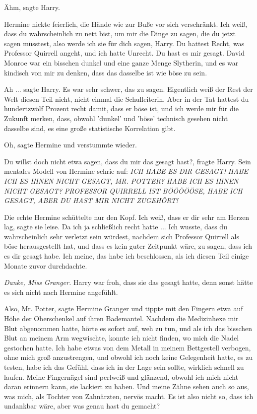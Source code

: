 \glqq{}Ähm\grqq{}, sagte Harry.

Hermine nickte feierlich, die Hände wie zur Buße vor sich verschränkt. \glqq{}Ich
weiß, dass du wahrscheinlich zu nett bist, um mir die Dinge zu sagen, die du
jetzt sagen müsstest, also werde ich sie für dich sagen, Harry. Du hattest
Recht, was Professor Quirrell angeht, und ich hatte Unrecht. Du hast es mir
gesagt. David Monroe war ein bisschen dunkel und eine ganze Menge Slytherin, und
es war kindisch von mir zu denken, dass das dasselbe ist wie böse zu
sein.\grqq{}

\glqq{}Ah ...\grqq{} sagte Harry. Es war sehr schwer, das zu sagen. \glqq{}
Eigentlich weiß der Rest der Welt diesen Teil nicht, nicht einmal die
Schulleiterin. Aber in der Tat hattest du hundertzwölf Prozent recht damit, dass
er böse ist, und ich werde mir für die Zukunft merken, dass, obwohl 'dunkel' und
'böse' technisch gesehen nicht dasselbe sind, es eine große statistische
Korrelation gibt.\grqq{}

\glqq{}Oh\grqq{}, sagte Hermine und verstummte wieder.

\glqq{}Du willst doch nicht etwa sagen, dass du mir das gesagt hast?\grqq{},
fragte Harry. Sein mentales Modell von Hermine schrie auf:
\emph{ICH HABE ES DIR GESAGT!}
\emph{HABE ICH ES IHNEN NICHT GESAGT, MR. POTTER? HABE ICH ES IHNEN NICHT
GESAGT?} \emph{PROFESSOR QUIRRELL IST BÖÖÖÖÖSE, HABE ICH GESAGT, ABER DU HAST
MIR NICHT ZUGEHÖRT!}

Die echte Hermine schüttelte nur den Kopf. \glqq{}Ich weiß, dass er dir sehr am
Herzen lag\grqq{}, sagte sie leise. \glqq{}Da ich ja schließlich recht hatte ...
Ich wusste, dass du wahrscheinlich sehr verletzt sein würdest, nachdem sich
Professor Quirrell als böse herausgestellt hat, und dass es kein guter Zeitpunkt
wäre, zu sagen, dass ich es dir gesagt habe. Ich meine, das habe ich
beschlossen, als ich diesen Teil einige Monate zuvor durchdachte.\grqq{}

\emph{Danke, Miss Granger.}
Harry war froh, dass sie das gesagt hatte, denn sonst hätte es sich nicht nach
Hermine angefühlt.

\glqq{}Also, Mr. Potter\grqq{}, sagte Hermine Granger und tippte mit den Fingern
etwa auf Höhe der Oberschenkel auf ihren Bademantel. \glqq{}Nachdem die
Medizinhexe mir Blut abgenommen hatte, hörte es sofort auf, weh zu tun, und als
ich das bisschen Blut an meinem Arm wegwischte, konnte ich nicht finden, wo mich
die Nadel gestochen hatte. Ich habe etwas von dem Metall in meinem Bettgestell
verbogen, ohne mich groß anzustrengen, und obwohl ich noch keine Gelegenheit
hatte, es zu testen, habe ich das Gefühl, dass ich in der Lage sein sollte,
wirklich schnell zu laufen. Meine Fingernägel sind perlweiß und glänzend, obwohl
ich mich nicht daran erinnern kann, sie lackiert zu haben. Und meine Zähne sehen
auch so aus, was mich, als Tochter von Zahnärzten, nervös macht. Es ist also
nicht so, dass ich undankbar wäre, aber was genau hast du gemacht?\grqq{}

